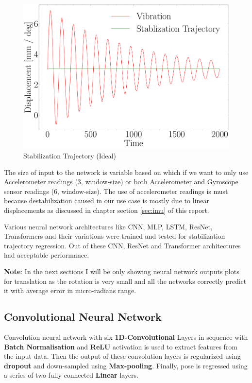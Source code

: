 \begin{figure}
    \centering
    \includegraphics[scale=0.25]{images/fig_chapter2/stab_traj_ideal.pdf}
    \caption{Stabilization Trajectory (Ideal)}
    \label{fig:stab_traj_ideal}
\end{figure}

The size of input to the network is variable based on which if we want to only use Accelerometer readings (3, window-size) or both Accelerometer and Gyroscope sensor readings (6, window-size). The use of accelerometer readings is must because destabilization caused in our use case is mostly due to linear displacements as discussed in chapter section \ref{sec:imu} of this report. 

Various neural network architectures like CNN, MLP, LSTM, ResNet, Transformers and their variations were trained and tested for stabilization trajectory regression. Out of these CNN, ResNet and Transformer architectures had acceptable performance. 

\textbf{Note}: In the next sections I will be only showing neural network outputs plots for translation as the rotation is very small and all the networks correctly predict it with average error in micro-radians range.


\subsection{Convolutional Neural Network}
Convolution neural network with six \textbf{1D-Convolutional} Layers in sequence with \textbf{Batch Normalisation} and  \textbf{ReLU} activation is used to extract features from the input data. Then the output of these convolution layers is regularized using \textbf{dropout} and down-sampled using \textbf{Max-pooling}. Finally, pose is regressed using a series of two fully connected \textbf{Linear} layers.

